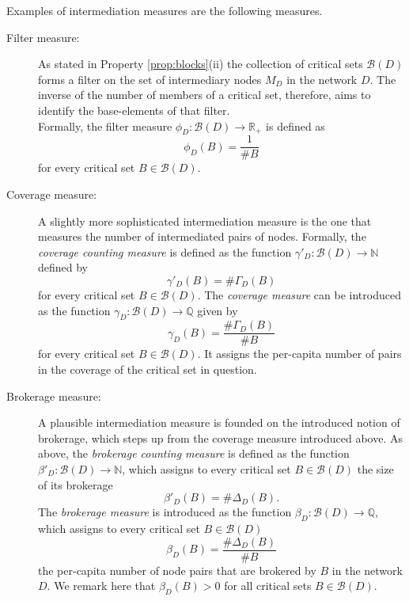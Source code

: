 Examples of intermediation measures are the following measures.
\begin{description}
\item[Filter measure:] As stated in Property \ref{prop:blocks}(ii) the collection of critical sets $\mathcal{B} (D)$ forms a filter on the set of intermediary nodes $M_D$ in the network $D$. The inverse of the number of members of a critical set, therefore, aims to identify the base-elements of that filter.
\\
Formally, the filter measure $\phi_D \colon \mathcal{B}(D) \to \mathbb{R}_+$ is defined as
\begin{equation}
\phi_D (B) = \frac{1}{\# B}
\end{equation}
for every critical set $B \in \mathcal{B} (D)$.

\item[Coverage measure:] A slightly more sophisticated intermediation measure is the one that measures the number of intermediated pairs of nodes. Formally, the \emph{coverage counting measure} is defined as the function $\gamma'_D \colon \mathcal{B} (D) \to \mathbb{N}$ defined by
\begin{equation}
\gamma'_D (B) = \# \Gamma_D (B)
\end{equation}
for every critical set $B \in \mathcal{B} (D)$. The \emph{coverage measure} can be introduced as the function $\gamma_D \colon \mathcal{B} (D) \to \mathbb{Q}$ given by
\begin{equation}
\gamma_D (B) = \frac{\# \Gamma_D (B)}{\# B}
\end{equation}
for every critical set $B \in \mathcal{B} (D)$. It assigns the per-capita number of pairs in the coverage of the critical set in question.

\item[Brokerage measure:] A plausible intermediation measure is founded on the introduced notion of brokerage, which steps up from the coverage measure introduced above. As above, the \emph{brokerage counting measure} is defined as the function $\beta'_D \colon \mathcal{B} (D) \to \mathbb{N}$, which assigns to every critical set $B \in \mathcal{B} (D)$ the size of its brokerage
\begin{equation}
\beta'_D (B) = \# \Delta_D (B) .
\end{equation}
The \emph{brokerage measure} is introduced as the function $\beta_D \colon \mathcal{B}(D) \to \mathbb{Q}$, which assigns to every critical set $B \in \mathcal{B} (D)$
\begin{equation} \label{eq:brokerage}
\beta_D (B) = \frac{\# \Delta_D (B)}{\# B}
\end{equation}
the per-capita number of node pairs that are brokered by $B$ in the network $D$. We remark here that $\beta_D (B) >0$ for all critical sets $B \in \mathcal{B}(D)$.


\end{description}
